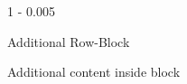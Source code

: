 \documentclass{postertheme}\usepackage[]{graphicx}\usepackage[]{color}
\begin{document}
\begin{frame}

\begin{columns}[onlytextwidth]
  
  \begin{column}{1 \textwidth - 0.005 \textwidth}
    \begin{block}{Additional Row-Block}
        
      Additional content inside block
        
    \end{block}
  \end{column}
\end{columns}

\end{frame}
\end{document}
